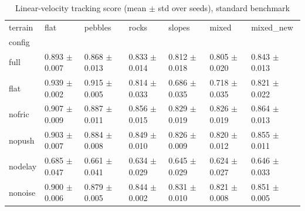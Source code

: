 \begin{table}
\caption{Linear-velocity tracking score (mean $\pm$ std over seeds), standard benchmark}
\label{tab:tab_lin_base}
\begin{tabular}{lllllll}
\toprule
terrain & flat & pebbles & rocks & slopes & mixed & mixed_new \\
config &  &  &  &  &  &  \\
\midrule
full & 0.893 $\pm$ 0.007 & 0.868 $\pm$ 0.013 & 0.833 $\pm$ 0.014 & 0.812 $\pm$ 0.018 & 0.805 $\pm$ 0.020 & 0.843 $\pm$ 0.013 \\
flat & 0.939 $\pm$ 0.002 & 0.915 $\pm$ 0.005 & 0.814 $\pm$ 0.033 & 0.686 $\pm$ 0.035 & 0.718 $\pm$ 0.035 & 0.821 $\pm$ 0.022 \\
nofric & 0.907 $\pm$ 0.009 & 0.887 $\pm$ 0.011 & 0.856 $\pm$ 0.015 & 0.829 $\pm$ 0.019 & 0.826 $\pm$ 0.019 & 0.864 $\pm$ 0.013 \\
nopush & 0.903 $\pm$ 0.007 & 0.884 $\pm$ 0.008 & 0.849 $\pm$ 0.010 & 0.826 $\pm$ 0.009 & 0.820 $\pm$ 0.012 & 0.855 $\pm$ 0.011 \\
nodelay & 0.685 $\pm$ 0.047 & 0.661 $\pm$ 0.041 & 0.634 $\pm$ 0.029 & 0.645 $\pm$ 0.029 & 0.624 $\pm$ 0.027 & 0.646 $\pm$ 0.033 \\
nonoise & 0.900 $\pm$ 0.006 & 0.879 $\pm$ 0.005 & 0.844 $\pm$ 0.002 & 0.831 $\pm$ 0.010 & 0.821 $\pm$ 0.008 & 0.851 $\pm$ 0.005 \\
\bottomrule
\end{tabular}
\end{table}
